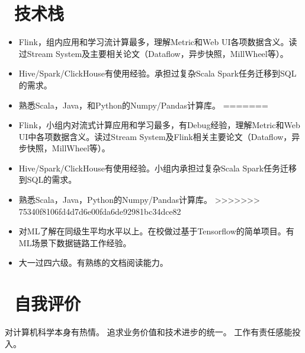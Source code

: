 \documentclass{resume}
\begin{document}
\section{\faCogs\ 技术栈}
\begin{itemize}[parsep=0.5ex]
<<<<<<< HEAD
  \item Flink，组内应用和学习流计算最多，理解Metric和Web UI各项数据含义。读过Stream System及主要相关论文（Dataflow，异步快照，MillWheel等）。
  \item Hive/Spark/ClickHouse有使用经验。承担过复杂Scala Spark任务迁移到SQL的需求。
  \item 熟悉Scala，Java，和Python的Numpy/Pandas计算库。
=======
  \item Flink，小组内对流式计算应用和学习最多，有Debug经验，理解Metric和Web UI中各项数据含义。读过Stream System及Flink相关主要论文（Dataflow，异步快照，MillWheel等）。
  \item Hive/Spark/ClickHouse有使用经验。小组内承担过复杂Scala Spark任务迁移到SQL的需求。
  \item 熟悉Scala，Java，Python的Numpy/Pandas计算库。
>>>>>>> 75340f8106fd4d7d6e00fda6de92981bc34dce82
  \item 对ML了解在同级生平均水平以上。在校做过基于Tensorflow的简单项目。有ML场景下数据链路工作经验。
  \item 大一过四六级。有熟练的文档阅读能力。

  
\end{itemize}

\section{\faInfo\ 自我评价}
\begin{onehalfspacing}
对计算机科学本身有热情。
追求业务价值和技术进步的统一。
工作有责任感能投入。
\end{onehalfspacing}

%
%
\end{document}
